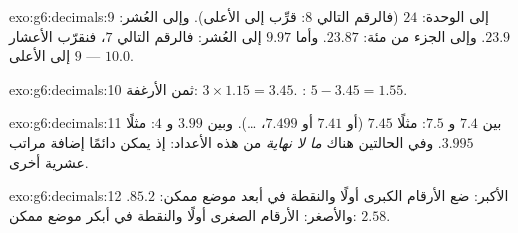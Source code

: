 \begin{solution}{exo:g6:decimals:9}
إلى الوحدة: $24$ (فالرقم التالي $8$: قرِّب إلى الأعلى). وإلى العُشر: $23.9$.
وإلى الجزء من مئة: $23.87$. وأما $9.97$ إلى العُشر: فالرقم التالي
$7$، فنقرّب الأعشار $9$ إلى الأعلى --- $10.0$.
\end{solution}

\begin{solution}{exo:g6:decimals:10}
ثمن الأرغفة: $3 \times 1.15 = 3.45$. :
$5 - 3.45 = 1.55$.
\end{solution}

\begin{solution}{exo:g6:decimals:11}
بين $7.4$ و $7.5$: مثلًا $7.45$ (أو $7.41$ أو $7.499$،
\dots). وبين $3.99$ و $4$: مثلًا $3.995$. وفي الحالتين
هناك \emph{ما لا نهاية} من هذه الأعداد: إذ يمكن دائمًا إضافة
مراتب عشرية أخرى.
\end{solution}

\begin{solution}{exo:g6:decimals:12}
الأكبر: ضع الأرقام الكبرى أولًا والنقطة في أبعد موضع
ممكن: $85.2$. والأصغر: الأرقام الصغرى أولًا والنقطة في أبكر
موضع ممكن: $2.58$.
\end{solution}

